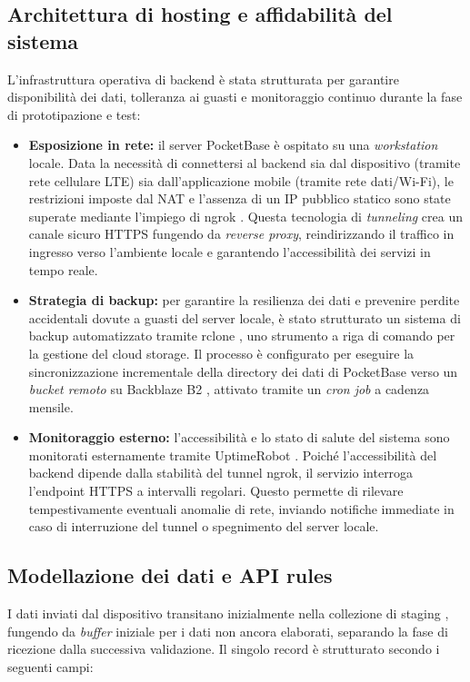 \documentclass[12pt,a4paper]{article}
\begin{document}
\subsection{Architettura di hosting e affidabilità del sistema}

L'infrastruttura operativa di backend è stata strutturata per garantire disponibilità dei dati, tolleranza ai guasti e monitoraggio continuo durante la fase di prototipazione e test:
\begin{itemize}
    \item \textbf{Esposizione in rete:} il server PocketBase è ospitato su una \textit{workstation} locale. Data la necessità di connettersi al backend sia dal dispositivo (tramite rete cellulare LTE) sia dall'applicazione mobile (tramite rete dati/Wi-Fi), le restrizioni imposte dal NAT e l'assenza di un IP pubblico statico sono state superate mediante l'impiego di ngrok \cite{ngrok}. Questa tecnologia di \textit{tunneling} crea un canale sicuro HTTPS fungendo da \textit{reverse proxy}, reindirizzando il traffico in ingresso verso l'ambiente locale e garantendo l'accessibilità dei servizi in tempo reale.
    \item \textbf{Strategia di backup:} per garantire la resilienza dei dati e prevenire perdite accidentali dovute a guasti del server locale, è stato strutturato un sistema di backup automatizzato tramite rclone \cite{rclone}, uno strumento a riga di comando per la gestione del cloud storage. Il processo è configurato per eseguire la sincronizzazione incrementale della directory dei dati di PocketBase verso un \textit{bucket remoto} su Backblaze B2 \cite{backblaze}, attivato tramite un \textit{cron job} a cadenza mensile.    
    \item \textbf{Monitoraggio esterno:} l'accessibilità e lo stato di salute del sistema sono monitorati esternamente tramite UptimeRobot \cite{uptimerobot}. Poiché l'accessibilità del backend dipende dalla stabilità del tunnel ngrok, il servizio interroga l'endpoint HTTPS a intervalli regolari. Questo permette di rilevare tempestivamente eventuali anomalie di rete, inviando notifiche immediate in caso di interruzione del tunnel o spegnimento del server locale.
\end{itemize}

\subsection{Modellazione dei dati e API rules}

I dati inviati dal dispositivo transitano inizialmente nella collezione di staging , 
fungendo da \textit{buffer} iniziale per i dati non ancora elaborati, separando la fase di ricezione dalla successiva validazione. 
Il singolo record è strutturato secondo i seguenti campi:
\end{document}
